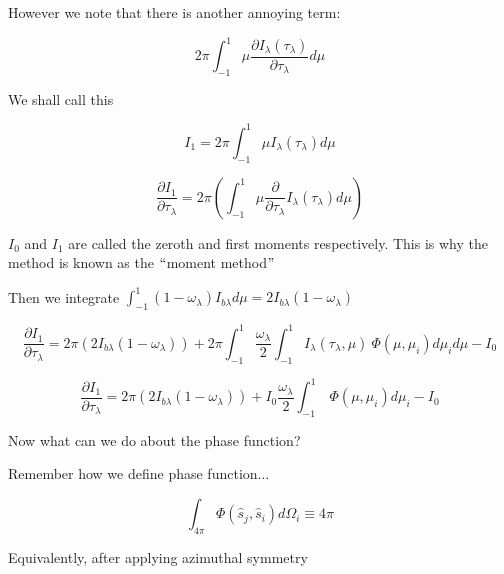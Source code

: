 \documentclass[12pt]{article}
\renewcommand{\_}{\kern-1.5pt\textunderscore\kern-1.5pt}
\begin{document}
\begin{itemize}
However we note that there is another annoying term: \par

 \[ 2 \pi  \int _{-1}^{1} \mu \frac{ \partial I_{ \lambda } \left(  \tau_{ \lambda } \right) }{ \partial  \tau_{ \lambda }}d \mu  \] \par

We shall call this\par

 \[ I_{1}=2 \pi  \int _{-1}^{1} \mu I_{ \lambda } \left(  \tau_{ \lambda } \right) d \mu  \] \par


\[
\frac{\partial I_{1}}{\partial\tau_{\lambda}}=2\pi(\int_{-1}^{1}\mu\frac{\partial}{\partial\tau_{\lambda}}I_{\lambda}(\tau_{\lambda})d\mu)
\]


 \( I_{0} \)  and  \( I_{1} \)  are called the zeroth and first moments respectively. This is why the method is known as the $``$moment method$"$ \par

Then we integrate  \(  \int _{-1}^{1} \left( 1- \omega _{ \lambda } \right) I_{b \lambda } d \mu =2I_{b \lambda } \left( 1- \omega _{ \lambda } \right)  \) \par

 \[ \frac{ \partial I_{1}}{ \partial  \tau_{ \lambda }}=2 \pi  \left( 2I_{b \lambda } \left( 1- \omega _{ \lambda } \right)  \right) +2 \pi  \int _{-1}^{1}\frac{ \omega _{ \lambda }}{2} \int _{-1}^{1}I_{ \lambda } \left(  \tau_{ \lambda }, \mu  \right) ~ \Phi  \left(  \mu , \mu _{i} \right) d \mu _{i}d \mu -I_{0} \] \par

 \[ \frac{ \partial I_{1}}{ \partial  \tau_{ \lambda }}=2 \pi  \left( 2I_{b \lambda } \left( 1- \omega _{ \lambda } \right)  \right) +I_{0}\frac{ \omega _{ \lambda }}{2} \int _{-1}^{1}~ \Phi  \left(  \mu , \mu _{i} \right) d \mu _{i}-I_{0} \] \par


\vspace{\baselineskip}
Now what can we do about the phase function?\par

Remember how we define phase function$ \ldots $ \par

 \[  \int _{4 \pi }^{} \Phi  \left( \hat{s}_{j},\hat{s}_{i} \right) d \Omega _{i} \equiv 4 \pi  \] \par

Equivalently, after applying azimuthal symmetry\par


\end{itemize}
\end{document}
